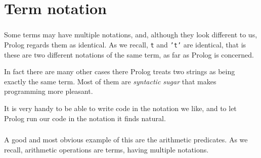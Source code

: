 \section{Term notation}

\begin{frame}
	\frametitle{\insertsection}
	
	Some terms may have multiple notations, and, although they look different to us, Prolog regards them as identical. As we recall, \texttt{t} and \texttt{'t'} are identical, that is these are two different notations of the same term, as far as Prolog is concerned.
	
	In fact there are many other cases there Prolog treats two strings as being exactly the same term. Most of them are \textit{syntactic sugar} that makes programming more pleasant.
	
	It is very handy to be able to write code in the notation we like, and to let Prolog run our code in the notation it finds natural.
\end{frame}


\begin{frame}
	\frametitle{\insertsection}
	
	A good and most obvious example of this are the arithmetic predicates. As we recall, arithmetic operations are terms, having multiple notations.
	

	
\end{frame}


